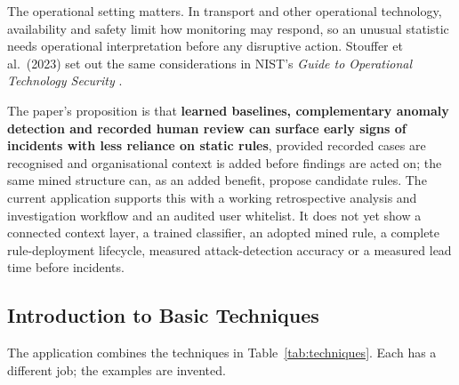 \documentclass[11pt,a4paper]{article}
\begin{document}
The operational setting matters. In transport and other operational technology, availability and safety limit how monitoring may respond, so an unusual statistic needs operational interpretation before any disruptive action. Stouffer et al.\ (2023) set out the same considerations in NIST's \emph{Guide to Operational Technology Security} \cite{ref1}.

The paper's proposition is that \textbf{learned baselines, complementary anomaly detection and recorded human review can surface early signs of incidents with less reliance on static rules}, provided recorded cases are recognised and organisational context is added before findings are acted on; the same mined structure can, as an added benefit, propose candidate rules. The current application supports this with a working retrospective analysis and investigation workflow and an audited user whitelist. It does not yet show a connected context layer, a trained classifier, an adopted mined rule, a complete rule-deployment lifecycle, measured attack-detection accuracy or a measured lead time before incidents.

\subsection{Introduction to Basic Techniques}

The application combines the techniques in Table~\ref{tab:techniques}. Each has a different job; the examples are invented.
\end{document}
